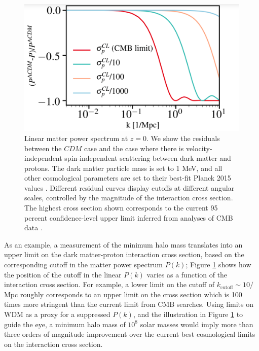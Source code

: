 \begin{figure}
\centering
\includegraphics[width=0.6\columnwidth]{figures/dmbaryon_pk.png}
\caption{Linear matter power spectrum at $z=0$. We show the residuals between the $CDM$ case and the case where there is velocity-independent spin-independent scattering between dark matter and protons. The dark matter particle mass is set to 1 MeV, and all other cosmological parameters are set to their best-fit Planck 2015 values \citep{Ade:2015xua}. Different residual curves display cutoffs at different angular scales, controlled by the magnitude of the interaction cross section. The highest cross section shown corresponds to the current 95 percent confidence-level upper limit inferred from analyses of CMB data \citep{Gluscevic:2017ywp,Boddy:2018kfv}.}
\label{fig:dmbaryon_pk}
\end{figure}
As an example, a measurement of the minimum halo mass translates into an upper limit on the dark matter-proton interaction cross section, based on the corresponding cutoff in the matter power spectrum $P(k)$; Figure \ref{fig:dmbaryon_pk} shows how the position of the cutoff in the linear $P(k)$ varies as a function of the interaction cross section. For example, a lower limit on the cutoff of $k_\text{cutoff}\sim 10/$Mpc roughly corresponds to an upper limit on the cross section which is 100 times more stringent than the current limit from CMB searches. Using limits on WDM as a proxy for a suppressed $P(k)$, and the illustration in Figure \ref{fig:dmbaryon_pk} to guide the eye, a minimum halo mass of $10^8$ solar masses would imply more than three orders of magnitude improvement over the current best cosmological limits on the interaction cross section.

